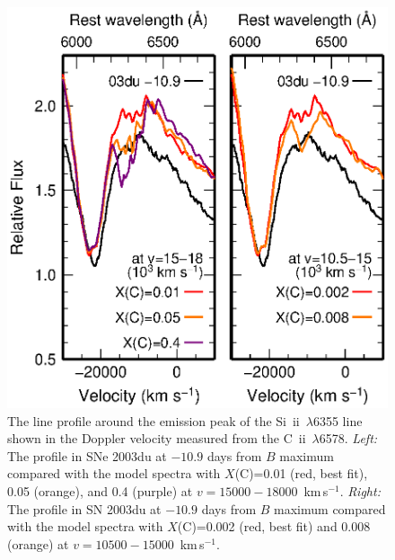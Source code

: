\documentclass[usegraphicx,usenatbib]{mn2e}
\newcommand{\kms}{\mbox{\,km\,s$^{-1}$}}
\newcommand{\CII}{C~{\sc ii}}
\newcommand{\SiII}{Si~{\sc ii}}
\begin{document}
\begin{figure}
  \includegraphics[scale=0.70]{f11.eps} 
  \caption{
The line profile around the emission peak of the \SiII\ $\lambda$6355 line 
shown in the Doppler velocity measured from the \CII\ $\lambda$6578.
{\it Left:} The profile in SNe 2003du at $-10.9$ days from $B$ maximum
compared with the model spectra with  
$X$(C)=0.01 (red, best fit), 0.05 (orange), and 0.4 (purple) 
at $v=15000-18000$ \kms.
{\it Right:} The profile in SN 2003du at $-10.9$ days from $B$ maximum
compared with the model spectra with  
$X$(C)=0.002 (red, best fit) and 0.008 (orange) at $v=10500-15000$ \kms.
}
\label{fig:C}
\end{figure}
\end{document}
